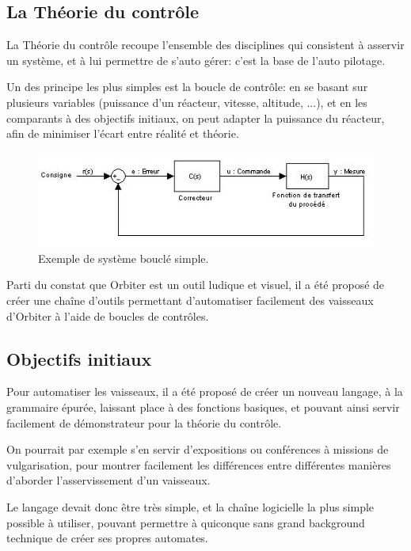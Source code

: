 \documentclass[a4paper,11pt]{article}
\begin{document}
    \subsection{La Théorie du contrôle}
        La Théorie du contrôle recoupe l'ensemble des disciplines qui consistent à asservir un système, et à lui permettre de s'auto gérer: c'est la base de l’auto pilotage.

        Un des principe les plus simples est la boucle de contrôle: en se basant sur plusieurs variables (puissance d'un réacteur, vitesse, altitude, ...), et en les comparants à des objectifs initiaux, on peut adapter la puissance du réacteur, afin de minimiser l'écart entre réalité et théorie.

        \begin{figure}[!h]
            \begin{center}
                \includegraphics[width=1\textwidth]{img/boucle_controle.jpg}
                \caption{Exemple de système bouclé simple.}
            \end{center}
        \end{figure}

        Parti du constat que Orbiter est un outil ludique et visuel, il a été proposé de créer une chaîne d'outils permettant d'automatiser facilement des vaisseaux d'Orbiter à l'aide de boucles de contrôles.

    \subsection{Objectifs initiaux}
        Pour automatiser les vaisseaux, il a été proposé de créer un nouveau langage, à la grammaire épurée, laissant place à des fonctions basiques, et pouvant ainsi servir facilement de démonstrateur pour la théorie du contrôle.

        On pourrait par exemple s'en servir d'expositions ou conférences à missions de vulgarisation, pour montrer facilement les différences entre différentes manières d'aborder l'asservissement d'un vaisseaux.

        Le langage devait donc être très simple, et la chaîne logicielle la plus simple possible à utiliser, pouvant permettre à quiconque sans grand background technique de créer ses propres automates.
\end{document}
